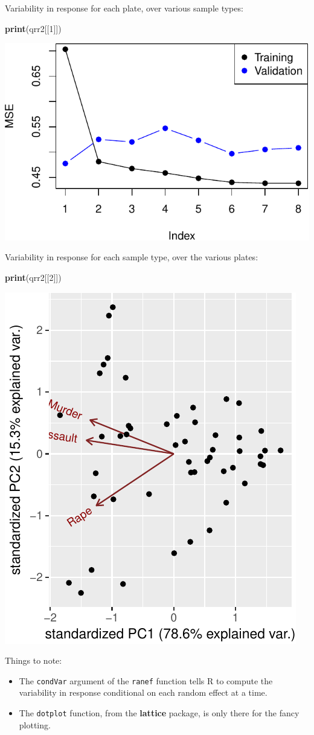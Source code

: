 \documentclass[]{book}
\newenvironment{Shaded}{\begin{snugshade}}{\end{snugshade}}
\newcommand{\KeywordTok}[1]{\textcolor[rgb]{0.13,0.29,0.53}{\textbf{#1}}}
\newcommand{\DecValTok}[1]{\textcolor[rgb]{0.00,0.00,0.81}{#1}}
\newcommand{\NormalTok}[1]{#1}
\providecommand{\tightlist}{%
  \setlength{\itemsep}{0pt}\setlength{\parskip}{0pt}}
\theoremstyle{definition}
\theoremstyle{definition}
\theoremstyle{definition}
\theoremstyle{remark}
\begin{document}
Variability in response for each plate, over various sample types:

\begin{Shaded}
\begin{Highlighting}[]
\KeywordTok{print}\NormalTok{(qrr2[[}\DecValTok{1}\NormalTok{]]) }
\end{Highlighting}
\end{Shaded}

\includegraphics[width=0.5\linewidth]{Rcourse_files/figure-latex/unnamed-chunk-188-1}

Variability in response for each sample type, over the various plates:

\begin{Shaded}
\begin{Highlighting}[]
\KeywordTok{print}\NormalTok{(qrr2[[}\DecValTok{2}\NormalTok{]])  }
\end{Highlighting}
\end{Shaded}

\includegraphics[width=0.5\linewidth]{Rcourse_files/figure-latex/unnamed-chunk-189-1}

Things to note:

\begin{itemize}
\tightlist
\item
  The \texttt{condVar} argument of the \texttt{ranef} function tells R
  to compute the variability in response conditional on each random
  effect at a time.
\item
  The \texttt{dotplot} function, from the \textbf{lattice} package, is
  only there for the fancy plotting.
\end{itemize}
\end{document}
